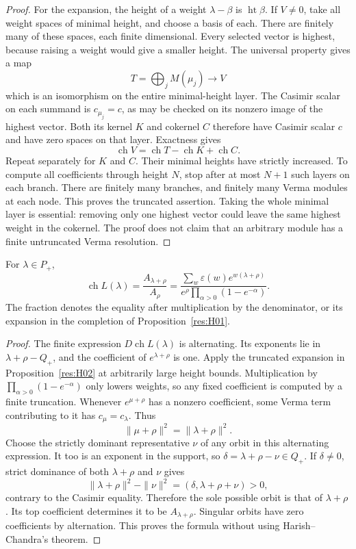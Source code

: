 \begin{proof}
For the expansion, the height of a weight \(\lambda-\beta\)
is \(\operatorname{ht}\beta\). If \(V\ne0\), take all weight
spaces of minimal height, and choose a basis of each.
There are finitely many of these spaces, each finite dimensional.
Every selected vector is highest, because raising a weight
would give a smaller height. The universal property gives a map
\[
 T=\bigoplus_j M(\mu_j)\longrightarrow V
\]
which is an isomorphism on the entire minimal-height layer.
The Casimir scalar on each summand is \(c_{\mu_j}=c\), as may
be checked on its nonzero image of the highest vector.
Both its kernel \(K\) and cokernel \(C\) therefore have Casimir
scalar \(c\) and have zero spaces on that layer. Exactness gives
\[
 \operatorname{ch}V=\operatorname{ch}T-\operatorname{ch}K+
                       \operatorname{ch}C.
\]
Repeat separately for \(K\) and \(C\). Their minimal heights have
strictly increased. To compute all coefficients through height
\(N\), stop after at most \(N+1\) such layers on each branch.
There are finitely many branches, and finitely many Verma modules
at each node. This proves the truncated assertion.
Taking the whole minimal layer is essential: removing only one
highest vector could leave the same highest weight in the cokernel.
The proof does not claim that an arbitrary module has a finite
untruncated Verma resolution.
\end{proof}

\begin{theorem}
\label{res:H03}
For \(\lambda\in P_+\),
\[
 \operatorname{ch}L(\lambda)=
 \frac{A_{\lambda+\rho}}{A_\rho}
 =\frac{\sum_w\varepsilon(w)e^{w(\lambda+\rho)}}
        {e^\rho\prod_{\alpha>0}(1-e^{-\alpha})}.
\]
The fraction denotes the equality after multiplication by the
denominator, or its expansion in the completion of
Proposition~\ref{res:H01}.
\end{theorem}
\begin{proof}
The finite expression \(D\operatorname{ch}L(\lambda)\) is
alternating. Its exponents lie in \(\lambda+\rho-Q_+\), and the
coefficient of \(e^{\lambda+\rho}\) is one.
Apply the truncated expansion in Proposition~\ref{res:H02} at
arbitrarily large height bounds. Multiplication by
\(\prod_{\alpha>0}(1-e^{-\alpha})\) only lowers weights,
so any fixed coefficient is computed by a finite truncation.
Whenever \(e^{\mu+\rho}\) has a nonzero coefficient, some
Verma term contributing to it has \(c_\mu=c_\lambda\). Thus
\[
 \|\mu+\rho\|^2=\|\lambda+\rho\|^2.
\]
Choose the strictly dominant representative \(\nu\) of any orbit
in this alternating expression. It too is an exponent in the
support, so \(\delta=\lambda+\rho-\nu\in Q_+\).
If \(\delta\ne0\), strict dominance of both \(\lambda+\rho\)
and \(\nu\) gives
\[
 \|\lambda+\rho\|^2-\|\nu\|^2
     =(\delta,\lambda+\rho+\nu)>0,
\]
contrary to the Casimir equality. Therefore the sole possible
orbit is that of \(\lambda+\rho\).
Its top coefficient determines it to be \(A_{\lambda+\rho}\).
Singular orbits have zero coefficients by alternation.
This proves the formula without using Harish--Chandra's theorem.
\end{proof}


